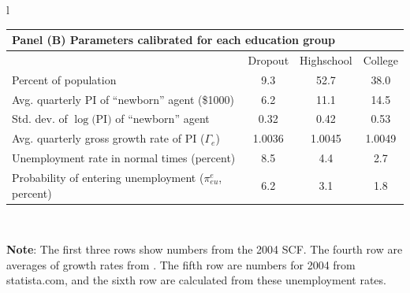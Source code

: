\documentclass[\econtexRoot/EGMN]{subfiles}
\begin{document}
{\begin{table}[p]
\begin{center}
\begin{tabular}{l}
                \begin{tabular}{lccc}
                    \toprule
                    \multicolumn{4}{l}{Panel (B) Parameters calibrated for each education group}                                      \\ \midrule
                                                                                   & Dropout        & Highschool     & College        \\ \midrule
                    Percent of population                                          & \phantom{0}9.3 & 52.7           & 38.0           \\
                    Avg. quarterly PI of ``newborn'' agent (\$1000)                & \phantom{0}6.2 & 11.1           & 14.5           \\
                    Std. dev. of $\log($PI$)$ of ``newborn'' agent                 & 0.32           & 0.42           & 0.53           \\
                    Avg. quarterly gross growth rate of PI ($\Gamma_e$)            & 1.0036         & 1.0045         & 1.0049         \\
                    Unemployment rate in normal times (percent)                    & \phantom{0}8.5 & \phantom{0}4.4 & \phantom{0}2.7 \\
                    Probability of entering unemployment ($\pi_{eu}^{e}$, percent) & \phantom{0}6.2 & \phantom{0}3.1 & \phantom{0}1.8
                    \\ \bottomrule
                \end{tabular} \\
                \parbox{16cm}{\small \vspace{.25cm} \textbf{Note}: The first three rows show numbers from the 2004 SCF. The fourth row are averages of growth rates from \cite{carroll2020modeling}. The fifth row are numbers for 2004 from statista.com, and the sixth row are calculated from these unemployment rates.\normalsize}
                \\ \\


\end{tabular}
\end{center}
\end{table}}
\end{document}
